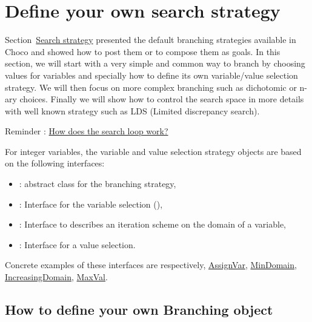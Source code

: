 \section{Define your own search strategy}\label{advanced:defineyourownsearchstrategy}\hypertarget{advanced:defineyourownsearchstrategy}{}
Section~\hyperlink{solver:searchstrategy}{Search strategy} presented the default branching strategies available in Choco and showed how to post them or to compose them as goals.
In this section, we will start with a very simple and common way to branch by choosing values for variables and specially how to define its own variable/value selection strategy. We will then focus on more complex branching such as dichotomic or n-ary choices. Finally we will show how to control the search space in more details with well known strategy such as LDS (Limited discrepancy search).

Reminder : \hyperlink{advanced:howdoesasearchloopwork}{How does the search loop work?}

For integer variables, the variable and value selection strategy objects are based on the following interfaces:
\begin{itemize}
	\item {}: abstract class for the branching strategy,
	\item {} : Interface for the variable selection (),
	\item {} : Interface to describes an iteration scheme on the domain of a variable,
	\item {} : Interface for a value selection.
\end{itemize}

Concrete examples of these interfaces are respectively,  \hyperlink{assignvar:assignvarbranchstrat}{AssignVar}, \hyperlink{mindomain:mindomainvarselector}{MinDomain}, \hyperlink{increasingdomain:increasingdomainvaliterator}{IncreasingDomain}, \hyperlink{maxval:maxvalvalselector}{MaxVal}.

\subsection{How to define your own Branching object}\label{advanced:beyondvariable/valueselection,howtodefineyourownbranchingobject}\hypertarget{advanced:beyondvariable/valueselection,howtodefineyourownbranchingobject}{}

